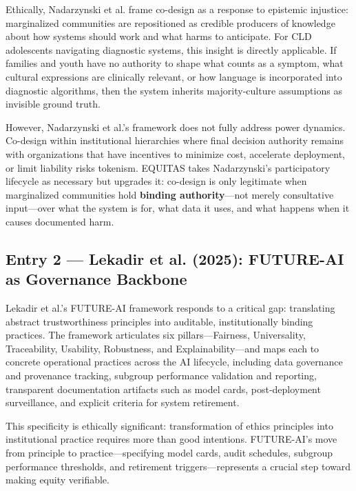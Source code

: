 \documentclass[12pt,a4paper]{article}
\begin{document}
Ethically, Nadarzynski et al. frame co-design as a response to epistemic injustice: marginalized communities are repositioned as credible producers of knowledge about how systems should work and what harms to anticipate. For CLD adolescents navigating diagnostic systems, this insight is directly applicable. If families and youth have no authority to shape what counts as a symptom, what cultural expressions are clinically relevant, or how language is incorporated into diagnostic algorithms, then the system inherits majority-culture assumptions as invisible ground truth.\cite{nadarzynski2024}

However, Nadarzynski et al.'s framework does not fully address power dynamics. Co-design within institutional hierarchies where final decision authority remains with organizations that have incentives to minimize cost, accelerate deployment, or limit liability risks tokenism. EQUITAS takes Nadarzynski's participatory lifecycle as necessary but upgrades it: co-design is only legitimate when marginalized communities hold \textbf{binding authority}—not merely consultative input—over what the system is for, what data it uses, and what happens when it causes documented harm.\cite{nadarzynski2024}

\subsection{Entry 2 — Lekadir et al. (2025): FUTURE-AI as Governance Backbone}

Lekadir et al.'s FUTURE-AI framework responds to a critical gap: translating abstract trustworthiness principles into auditable, institutionally binding practices. The framework articulates six pillars—Fairness, Universality, Traceability, Usability, Robustness, and Explainability—and maps each to concrete operational practices across the AI lifecycle, including data governance and provenance tracking, subgroup performance validation and reporting, transparent documentation artifacts such as model cards, post-deployment surveillance, and explicit criteria for system retirement.\cite{lekadir2025}

This specificity is ethically significant: transformation of ethics principles into institutional practice requires more than good intentions. FUTURE-AI's move from principle to practice—specifying model cards, audit schedules, subgroup performance thresholds, and retirement triggers—represents a crucial step toward making equity verifiable.\cite{lekadir2025}
\end{document}
